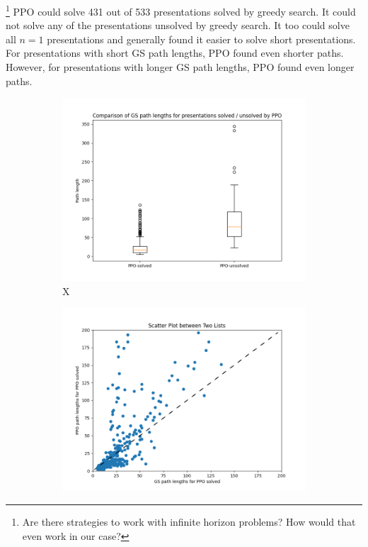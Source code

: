 \footnote{Are there strategies to work with infinite horizon problems? How would that even work in our case?}
PPO could solve 431 out of 533 presentations solved by greedy search. It could not solve any of the presentations unsolved by greedy search. It too could solve all $n=1$ presentations and generally found it easier to solve short presentations. For presentations with short GS path lengths, PPO found even shorter paths. However, for presentations with longer GS path lengths, PPO found even longer paths. 

\begin{figure}
	\centering
	\begin{subfigure}[b]{0.5\textwidth}
		\includegraphics[width=\textwidth]{fig/path_lengths_ppo_solved_vs_unsolved.png}
		\caption{ X}
		\label{fig:path_lengths_ppo_solved_vs_unsolved}
	\end{subfigure}%
	\begin{subfigure}[b]{0.5\textwidth}
		\centering
		\includegraphics[width=1.1\textwidth]{fig/path_lengths_gs_vs_ppo.png}

\end{subfigure}
\end{figure}
